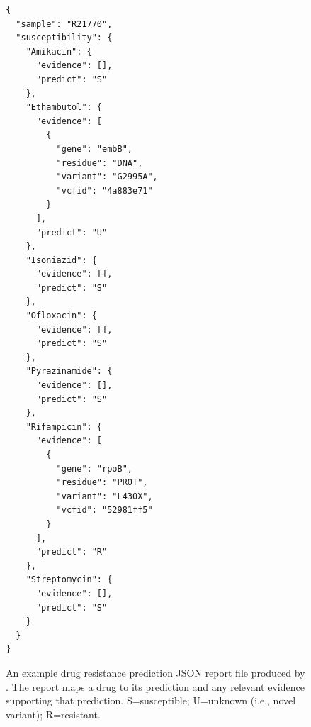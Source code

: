 \begin{figure}
\begin{verbatim}
{
  "sample": "R21770",
  "susceptibility": {
    "Amikacin": {
      "evidence": [],
      "predict": "S"
    },
    "Ethambutol": {
      "evidence": [
        {
          "gene": "embB",
          "residue": "DNA",
          "variant": "G2995A",
          "vcfid": "4a883e71"
        }
      ],
      "predict": "U"
    },
    "Isoniazid": {
      "evidence": [],
      "predict": "S"
    },
    "Ofloxacin": {
      "evidence": [],
      "predict": "S"
    },
    "Pyrazinamide": {
      "evidence": [],
      "predict": "S"
    },
    "Rifampicin": {
      "evidence": [
        {
          "gene": "rpoB",
          "residue": "PROT",
          "variant": "L430X",
          "vcfid": "52981ff5"
        }
      ],
      "predict": "R"
    },
    "Streptomycin": {
      "evidence": [],
      "predict": "S"
    }
  }
}
\end{verbatim}
\caption{An example drug resistance prediction JSON report file produced by \drprg{}. The report maps a drug to its prediction and any relevant evidence supporting that prediction. S=susceptible; U=unknown (i.e., novel variant); R=resistant.}
\label{fig:example-drprg-report}
\end{figure}